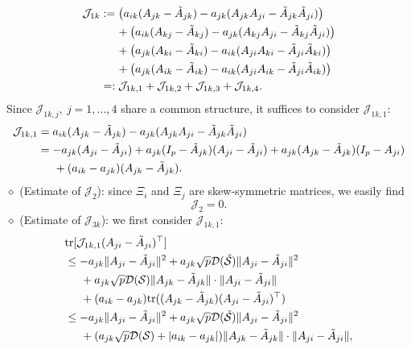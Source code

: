 \documentclass[11pt,reqno]{amsart}
\numberwithin{figure}{section}
\begin{document}
\begin{align} \label{C-12-3}
\begin{aligned}
\mathcal J_{1k} &: = \big( a_{ik} ( A_{jk} - \tilde A_{jk}) - a_{jk}(A_{jk} A_{ji} - \tilde A_{jk} \tilde A_{ji}) \big)  \\
&\hspace{0.5cm}+ \big( a_{ik} ( A_{kj} - \tilde A_{kj}) - a_{jk}(A_{kj} A_ {ji} - \tilde A_{kj} \tilde A_{ji}) \big)  \\
&\hspace{0.5cm}+ \big( a_{jk} (A_{ki} - \tilde A_{ki}) - a_{ik} (A_{ji} A_{ki} - \tilde A_{ji} \tilde A_{ki} )        \big)  \\
&\hspace{0.5cm}+ \big(   a_{jk}(A_{ik} -\tilde A_{ik}) - a_{ik}(A_{ji} A_{ik} - \tilde A_{ji} \tilde A_{ik})     \big) \\
& = : \mathcal J_{1k,1} + \mathcal J_{1k,2} + \mathcal J_{1k,3} + \mathcal J_{1k,4}. 
\end{aligned}
\end{align}
Since $\mathcal J_{1k,j},~j=1,\ldots,4$ share a common structure, it suffices to consider $\mathcal J_{1k,1}$:
\begin{align} \label{C-12-4}
\begin{aligned}
\mathcal J_{1k,1}& = a_{ik} ( A_{jk} - \tilde A_{jk}) - a_{jk}(A_{jk} A_{ji} - \tilde A_{jk} \tilde A_{ji}) \\
& = -a_{jk}(A_{ji} - \tilde A_{ji}) + a_{jk}(I_p - \tilde A_{jk} )(A_{ji} - \tilde A_{ji}) + a_{jk}(A_{jk} - \tilde A_{jk}) (I_p - A_{ji})  \\
&\hspace{0.5cm}+ (a_{ik} - a_{jk})(A_{jk} - \tilde A_{jk}).
\end{aligned}
\end{align}
$\diamond$ (Estimate of $\mathcal J_{2}$): since $\Xi_i$ and $\Xi_j$ are skew-symmetric matrices, we easily find 
\[
\mathcal J_2 = 0.
\]
$\diamond$ (Estimate of $\mathcal J_{3k}$): we first consider $\mathcal J_{1k,1}$:
\begin{align*}
&\textup{tr}[  \mathcal J_{1k,1}(A_{ji} - \tilde A_{ji})^\top  ]\\
&   \leq  -a_{jk} \|A_{ji} - \tilde A_{ji}\|^2 + a_{jk}\sqrt{p} \mathcal D(\tilde{\mathcal S}) \|A_{ji} -\tilde A_{ji}\|^2 \\
&  \hspace{0.5cm} + a_{jk}\sqrt{p}\mathcal D( \mathcal S) \|A_{jk} -\tilde A_{jk}\|\cdot \|A_{ji} - \tilde A_{ji}\|\\
&  \hspace{0.5cm} +  (a_{ik} - a_{jk}) \textup{tr} (( A_{jk} - \tilde A_{jk})(A_{ji} - \tilde A_{ji})^\top ) \\
& \leq  -a_{jk} \|A_{ji} - \tilde A_{ji}\|^2 + a_{jk}\sqrt{p} \mathcal D(\tilde{\mathcal S}) \|A_{ji} -\tilde A_{ji}\|^2 \\
&  \hspace{0.5cm} + ( a_{jk}\sqrt{p}\mathcal D( \mathcal S) + |a_{ik} - a_{jk}|)\|A_{jk} -\tilde A_{jk}\|\cdot \|A_{ji} - \tilde A_{ji}\|,
\end{align*}
\end{document}
